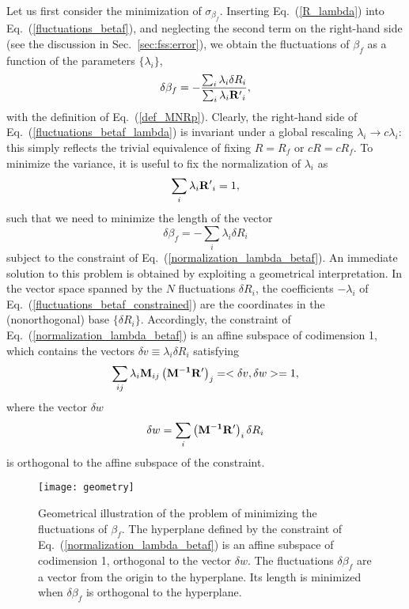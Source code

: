 \documentclass[pre,twocolumn]{revtex4-2}
\begin{document}
Let us first consider the minimization of $\sigma_{\beta_f}$. Inserting Eq.~(\ref{R_lambda}) into Eq.~(\ref{fluctuations_betaf}), and neglecting the second term on the right-hand side (see the discussion in Sec.~\ref{sec:fss:error}), we obtain the fluctuations of $\beta_f$ as a function of the parameters $\{\lambda_i\}$,
\begin{equation}
  \delta\beta_f = -\frac{\sum_i \lambda_i \delta R_i}{\sum_i \lambda_i {\bf R'}_i},
  \label{fluctuations_betaf_lambda}
\end{equation}
with the definition of Eq.~(\ref{def_MNRp}).
Clearly, the right-hand side of Eq.~(\ref{fluctuations_betaf_lambda}) is invariant under a global rescaling $\lambda_i\rightarrow c \lambda_i$: this simply reflects the trivial equivalence of
fixing $R=R_f$ or $cR=cR_f$.
To minimize the variance, it is useful to fix the normalization of $\lambda_i$ as
\begin{equation}
  \sum_i \lambda_i {\bf R'}_i=1,
  \label{normalization_lambda_betaf}
\end{equation}
such that we need to minimize the length of the vector
\begin{equation}
  \delta\beta_f = -\sum_i \lambda_i \delta R_i
  \label{fluctuations_betaf_constrained}
\end{equation}
subject to the constraint of Eq.~(\ref{normalization_lambda_betaf}).
An immediate solution to this problem is obtained by exploiting a geometrical interpretation.
In the vector space spanned by the $N$ fluctuations $\delta R_i$, the coefficients $-\lambda_i$ of Eq.~(\ref{fluctuations_betaf_constrained}) are the coordinates in the (nonorthogonal) base $\{\delta R_i\}$.
Accordingly, the constraint of Eq.~(\ref{normalization_lambda_betaf}) is an affine subspace of codimension 1, which contains the vectors $\delta v\equiv \lambda_i \delta R_i$ satisfying
\begin{equation}
  \sum_{ij} \lambda_i {\bf M}_{ij} \left({\bf M^{-1}R'}\right)_j = <\delta v, \delta w> = 1,
  \label{affine_betaf}
\end{equation}
where the vector $\delta w$
\begin{equation}
  \delta w = \sum_i \left({\bf M^{-1}R'}\right)_i \delta R_i
  \label{w}
\end{equation}
is orthogonal to the affine subspace of the constraint.
\begin{figure}
  \centering
  \texttt{[image: geometry]}
  \caption{Geometrical illustration of the problem of minimizing the fluctuations of $\beta_f$.
    The hyperplane defined by the constraint of Eq.~(\ref{normalization_lambda_betaf}) is an affine subspace of codimension 1, orthogonal to the vector $\delta w$. The fluctuations $\delta\beta_f$ are a vector from the origin to the hyperplane. Its length is minimized when $\delta\beta_f$ is orthogonal to the hyperplane.}
  \label{geometry_betaf}
\end{figure}
\end{document}
